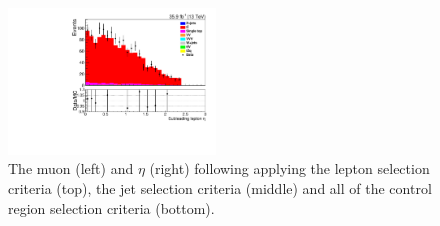 \begin{figure}[ht]
\includegraphics[width=0.49\textwidth]{figs/background-estimation/plots/unblinded/ttbar_control/lep2Eta_SingleTop_wMass_emu.pdf}
\caption{
The muon \pT (left) and $\eta$ (right) following applying the lepton selection criteria (top), the jet selection criteria (middle) and all of the \ttbar control region selection criteria (bottom).
}
\label{fig:App_ttbar_muon}
\end{figure}

